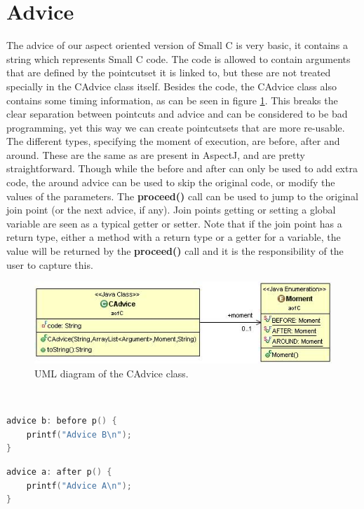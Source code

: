 \documentclass[a4paper]{report}
\begin{document}
\section{Advice}
The advice of our aspect oriented version of Small C is very basic, it contains a string which represents Small C code. The code is allowed to contain arguments that are defined by the pointcutset it is linked to, but these are not treated specially in the CAdvice class itself. Besides the code, the CAdvice class also contains some timing information, as can be seen in figure \ref{fig:CAdvice}. This breaks the clear separation between pointcuts and advice and can be considered to be bad programming, yet this way we can create pointcutsets that are more re-usable. The different types, specifying the moment of execution, are before, after and around. These are the same as are present in AspectJ, and are pretty straightforward. Though while the before and after can only be used to add extra code, the around advice can be used to skip the original code, or modify the values of the parameters. The \textbf{proceed()} call can be used to jump to the original join point (or the next advice, if any). Join points getting or setting a global variable are seen as a typical getter or setter. Note that if the join point has a return type, either a method with a return type or a getter for a variable, the value will be returned by the \textbf{proceed()} call and it is the responsibility of the user to capture this.
\begin{figure}
\centering
\includegraphics[scale=0.7]{images/AOFC/CAdvice.jpg}
\caption{UML diagram of the CAdvice class.}
\label{fig:CAdvice}
\end{figure}\\
\begin{minipage}{0.42\textwidth}
\begin{lstlisting}[language=C, caption=Example of a before advice, label=lst:SmallC_BeforeAdvice]
advice b: before p() {
	printf("Advice B\n");
}
\end{lstlisting}
\begin{lstlisting}[language=C, caption=Example of an after advice, label=lst:SmallC_AfterAdvice]
advice a: after p() {
	printf("Advice A\n");
}
\end{lstlisting}
\end{minipage}\hfill
\end{document}
